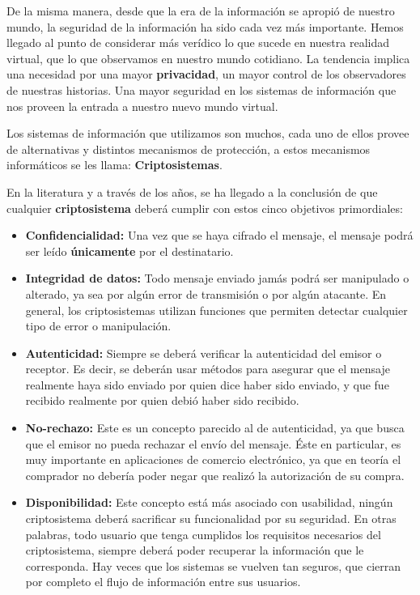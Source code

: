 De la misma manera, desde que la era de la información se apropió de nuestro mundo, la seguridad de la información ha sido cada vez más importante. Hemos llegado al punto de considerar más verídico lo que sucede en nuestra realidad virtual, que lo que observamos en nuestro mundo cotidiano.
La tendencia implica una necesidad por una mayor {\bf privacidad}, un mayor control de los observadores de nuestras historias. Una mayor seguridad en los sistemas de información que nos proveen la entrada a nuestro nuevo mundo virtual.

Los sistemas de información que utilizamos son muchos, cada uno de ellos provee de alternativas y distintos mecanismos de protección, a estos mecanismos informáticos se les llama: {\bf Criptosistemas}.

En la literatura y a través de los años, se ha llegado a la conclusión de que cualquier  {\bf criptosistema} deberá cumplir con estos cinco objetivos primordiales:
\begin{itemize}
	\item {\bf Confidencialidad:} Una vez que se haya cifrado el mensaje, el mensaje podrá ser leído {\bf únicamente} por el destinatario.
		\item {\bf Integridad de datos:} Todo mensaje enviado jamás podrá ser manipulado o alterado, ya sea por algún error de transmisión o por algún atacante. En general, los criptosistemas utilizan funciones que permiten detectar cualquier tipo de error o manipulación.
		\item {\bf Autenticidad:} Siempre se deberá verificar la autenticidad del emisor o receptor. Es decir, se deberán usar métodos para asegurar que el mensaje realmente haya sido enviado por quien dice haber sido enviado, y que fue recibido realmente por quien debió haber sido recibido.
		\item {\bf No-rechazo:} Este es un concepto parecido al de autenticidad, ya que  busca que el emisor no pueda rechazar el envío del mensaje. Éste en particular, es muy importante en aplicaciones de comercio electrónico, ya que en teoría el comprador no debería poder negar que realizó la autorización de su compra.
		\item {\bf Disponibilidad:} Este concepto está más asociado con usabilidad, ningún criptosistema deberá sacrificar su funcionalidad por su seguridad. En otras palabras, todo usuario que tenga cumplidos los requisitos necesarios del criptosistema,  siempre deberá poder recuperar la información que le corresponda. Hay veces que los sistemas se vuelven tan seguros, que cierran por completo el flujo de información entre sus usuarios.

\end{itemize}

